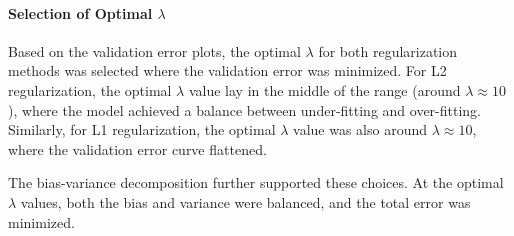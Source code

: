 \documentclass{article}
\begin{document}
\paragraph{Selection of Optimal $\lambda$}
Based on the validation error plots, the optimal $\lambda$ for both regularization methods was selected where the validation error was minimized. For L2 regularization, the optimal $\lambda$ value lay in the middle of the range (around $\lambda \approx 10$ ), where the model achieved a balance between under-fitting and over-fitting. Similarly, for L1 regularization, the optimal $\lambda$ value was also around $\lambda \approx 10$, where the validation error curve flattened.

The bias-variance decomposition further supported these choices. At the optimal $\lambda$ values, both the bias and variance were balanced, and the total error was minimized.
\end{document}
